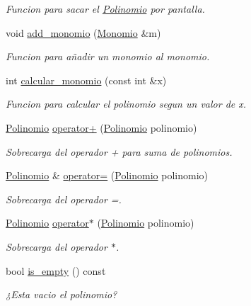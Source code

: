 \begin{DoxyCompactItemize}
\begin{DoxyCompactList}\small\item\em Funcion para sacar el \hyperlink{classed_1_1Polinomio}{Polinomio} por pantalla. \end{DoxyCompactList}\item 
void \hyperlink{classed_1_1Polinomio_a295f28995118585cc8fe09187b578296}{add\+\_\+monomio} (\hyperlink{classed_1_1Monomio}{Monomio} \&m)
\begin{DoxyCompactList}\small\item\em Funcion para añadir un monomio al monomio. \end{DoxyCompactList}\item 
int \hyperlink{classed_1_1Polinomio_af976ae82a485df84ae84a9805170b4fa}{calcular\+\_\+monomio} (const int \&x)
\begin{DoxyCompactList}\small\item\em Funcion para calcular el polinomio segun un valor de x. \end{DoxyCompactList}\item 
\hyperlink{classed_1_1Polinomio}{Polinomio} \hyperlink{classed_1_1Polinomio_abf56d10f0da81b50077baf8175f4dfd5}{operator+} (\hyperlink{classed_1_1Polinomio}{Polinomio} polinomio)
\begin{DoxyCompactList}\small\item\em Sobrecarga del operador + para suma de polinomios. \end{DoxyCompactList}\item 
\hyperlink{classed_1_1Polinomio}{Polinomio} \& \hyperlink{classed_1_1Polinomio_afc45108878dfb8c3520347a854956457}{operator=} (\hyperlink{classed_1_1Polinomio}{Polinomio} polinomio)
\begin{DoxyCompactList}\small\item\em Sobrecarga del operador =. \end{DoxyCompactList}\item 
\hyperlink{classed_1_1Polinomio}{Polinomio} \hyperlink{classed_1_1Polinomio_a924be208406f7d54f240cb166c473a95}{operator$\ast$} (\hyperlink{classed_1_1Polinomio}{Polinomio} polinomio)
\begin{DoxyCompactList}\small\item\em Sobrecarga del operador $\ast$. \end{DoxyCompactList}\item 
bool \hyperlink{classed_1_1Polinomio_acf75780f0180fac78b2f26b6573f7058}{is\+\_\+empty} () const 
\begin{DoxyCompactList}\small\item\em ¿\+Esta vacio el polinomio? \end{DoxyCompactList}\end{DoxyCompactItemize}
